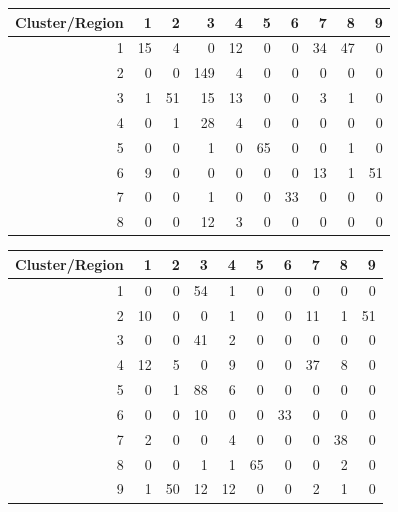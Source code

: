 \documentclass[12pt, leqno]{article}
\begin{document}
\begin{table}[ht]
\centering
\begin{tabular}{rrrrrrrrrr}
  \hline
Cluster/Region & 1 & 2 & 3 & 4 & 5 & 6 & 7 & 8 & 9 \\ 
  \hline
1 &  15 &   4 &   0 &  12 &   0 &   0 &  34 &  47 &   0 \\ 
  2 &   0 &   0 & 149 &   4 &   0 &   0 &   0 &   0 &   0 \\ 
  3 &   1 &  51 &  15 &  13 &   0 &   0 &   3 &   1 &   0 \\ 
  4 &   0 &   1 &  28 &   4 &   0 &   0 &   0 &   0 &   0 \\ 
  5 &   0 &   0 &   1 &   0 &  65 &   0 &   0 &   1 &   0 \\ 
  6 &   9 &   0 &   0 &   0 &   0 &   0 &  13 &   1 &  51 \\ 
  7 &   0 &   0 &   1 &   0 &   0 &  33 &   0 &   0 &   0 \\ 
  8 &   0 &   0 &  12 &   3 &   0 &   0 &   0 &   0 &   0 \\ 
   \hline
\end{tabular}
\end{table}

\begin{table}[ht]
\centering
\begin{tabular}{rrrrrrrrrr}
  \hline
Cluster/Region  & 1 & 2 & 3 & 4 & 5 & 6 & 7 & 8 & 9 \\ 
  \hline
1 &   0 &   0 &  54 &   1 &   0 &   0 &   0 &   0 &   0 \\ 
  2 &  10 &   0 &   0 &   1 &   0 &   0 &  11 &   1 &  51 \\ 
  3 &   0 &   0 &  41 &   2 &   0 &   0 &   0 &   0 &   0 \\ 
  4 &  12 &   5 &   0 &   9 &   0 &   0 &  37 &   8 &   0 \\ 
  5 &   0 &   1 &  88 &   6 &   0 &   0 &   0 &   0 &   0 \\ 
  6 &   0 &   0 &  10 &   0 &   0 &  33 &   0 &   0 &   0 \\ 
  7 &   2 &   0 &   0 &   4 &   0 &   0 &   0 &  38 &   0 \\ 
  8 &   0 &   0 &   1 &   1 &  65 &   0 &   0 &   2 &   0 \\ 
  9 &   1 &  50 &  12 &  12 &   0 &   0 &   2 &   1 &   0 \\ 
   \hline
\end{tabular}
\end{table}
\end{document}
